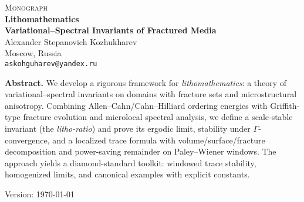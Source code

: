 \documentclass[11pt]{book}
\numberwithin{equation}{section}
\begin{document}
\begin{titlepage}
  \centering
  \vspace*{6mm}
  {\Large\scshape Monograph}\\[12mm]
  {\LARGE\bfseries Lithomathematics}\\[3mm]
  {\large\bfseries Variational--Spectral Invariants of Fractured Media}\\[16mm]

  {\large Alexander Stepanovich Kozhukharev}\\[2mm]
  Moscow, Russia\\[2mm]
  \texttt{askohguharev@yandex.ru}\\[14mm]

  \vfill

  \begin{tcolorbox}[colback=white,colframe=black!15,sharp corners,boxrule=0.3pt]
    \small
    \textbf{Abstract.}\;
    We develop a rigorous framework for \emph{lithomathematics}:
    a theory of variational--spectral invariants on domains with
    fracture sets and microstructural anisotropy. Combining
    Allen--Cahn/Cahn--Hilliard ordering energies with Griffith-type
    fracture evolution and microlocal spectral analysis, we define a
    scale-stable invariant (the \emph{litho-ratio}) and prove its
    ergodic limit, stability under $\Gamma$-convergence, and a
    localized trace formula with volume/surface/fracture decomposition
    and power-saving remainder on Paley--Wiener windows. The approach
    yields a diamond-standard toolkit: windowed trace stability,
    homogenized limits, and canonical examples with explicit constants.
  \end{tcolorbox}

  \vfill
  {\small Version: \today}
\end{titlepage}

\setcounter{page}{1}

\tableofcontents
\clearpage




\end{document}

